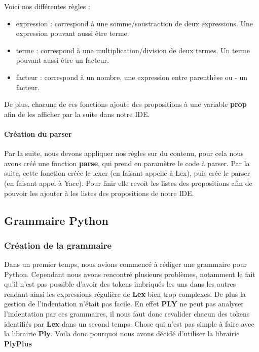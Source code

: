 \documentclass[a4paper,12pt]{article}
\begin{document}
				Voici nos différentes règles : 
				\begin{itemize}
					\item expression : correspond à une somme/soustraction de deux expressions. Une expression pouvant aussi être terme.
					\item terme : correspond à une multiplication/division de deux termes. Un terme pouvant aussi être un facteur.
					\item facteur : correspond à un nombre, une expression entre parenthèse ou - un facteur.
				\end{itemize}

				De plus, chacune de ces fonctions ajoute des propositions à une variable \textbf{prop} afin de les afficher par la suite dans notre IDE.

			\paragraph{Création du parser}

				Par la suite, nous devons appliquer nos règles sur du contenu, pour cela nous avons créé une fonction \textbf{parse}, qui prend en paramètre le code à parser. Par la suite, cette fonction créée le lexer (en faisant appelle à Lex), puis crée le parser (en faisant appel à Yacc). Pour finir elle revoit les listes des propositions afin de pouvoir les ajouter à les listes des propositions de notre IDE.
	
	\subsection{Grammaire Python}

		\subsubsection{Création de la grammaire}

			Dans un premier temps, nous avions commencé à rédiger une grammaire pour Python. Cependant nous avons rencontré plusieurs problèmes, notamment le fait qu'il n'est pas possible d'avoir des tokens imbriqués les uns dans les autres rendant ainsi les expressions régulière de \textbf{Lex} bien trop complexes. De plus la gestion de l'indentation n'était pas facile. En effet \textbf{PLY} ne peut pas analyser l'indentation par ces grammaires, il nous faut donc revalider chacun des tokens identifiés par \textbf{Lex} dans un second temps. Chose qui n'est pas simple à faire avec la librairie \textbf{Ply}. Voila donc pourquoi nous avons décidé d'utiliser la librairie \textbf{PlyPlus}
\end{document}
